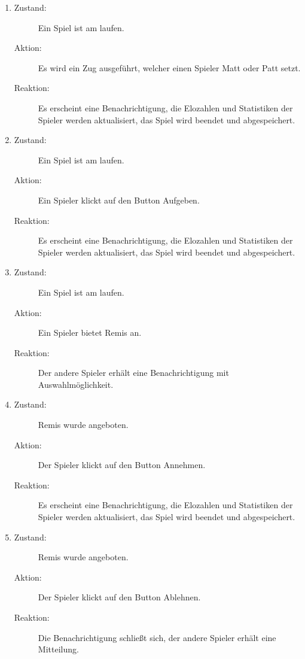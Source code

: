 \documentclass[parskip=full]{scrartcl}
\begin{document}
\begin{enumerate}
	\item
	\begin{description}
	\item[Zustand:] Ein Spiel ist am laufen.
	\item[Aktion:] Es wird ein Zug ausgeführt, welcher einen Spieler Matt oder Patt setzt.
	\item[Reaktion:] Es erscheint eine Benachrichtigung, die Elozahlen und Statistiken der Spieler werden aktualisiert, das Spiel wird beendet und abgespeichert.  \\
	\end{description}
	
	\item
	\begin{description}
	\item[Zustand:] Ein Spiel ist am laufen.
	\item[Aktion:] Ein Spieler klickt auf den Button \glqq Aufgeben\grqq.
	\item[Reaktion:] Es erscheint eine Benachrichtigung, die Elozahlen und Statistiken der Spieler werden aktualisiert, das Spiel wird beendet und abgespeichert.  \\
	\end{description}
	
	\item
	\begin{description}
	\item[Zustand:] Ein Spiel ist am laufen.
	\item[Aktion:] Ein Spieler bietet Remis an.
	\item[Reaktion:] Der andere Spieler erhält eine Benachrichtigung mit Auswahlmöglichkeit.  \\
	\end{description}
	
	\item
	\begin{description}
	\item[Zustand:] Remis wurde angeboten.
	\item[Aktion:] Der Spieler klickt auf den Button \glqq Annehmen\grqq.
	\item[Reaktion:] Es erscheint eine Benachrichtigung, die Elozahlen und Statistiken der Spieler werden aktualisiert, das Spiel wird beendet und abgespeichert.  \\
	\end{description}
	
	\item
	\begin{description}
	\item[Zustand:] Remis wurde angeboten.
	\item[Aktion:] Der Spieler klickt auf den Button \glqq Ablehnen\grqq.
	\item[Reaktion:] Die Benachrichtigung schließt sich, der andere Spieler erhält eine Mitteilung.  \\
	\end{description}




\end{enumerate}
\end{document}
